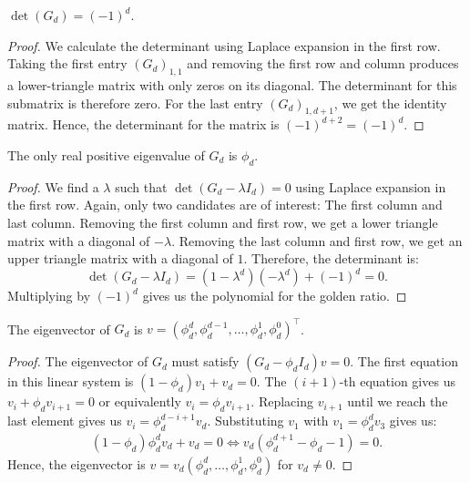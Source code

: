 \documentclass[english,version-2020-11]{uzl-thesis}
\begin{document}
\begin{lemma}
  $\det(G_d) = (-1)^d$.
\end{lemma}

\begin{proof}
  We calculate the determinant using Laplace expansion in the first row.
  Taking the first entry $(G_d)_{1,1}$ and removing the first row and column produces
  a lower-triangle matrix with only zeros on its diagonal.
  The determinant for this submatrix is therefore zero.
  For the last entry $(G_d)_{1,d+1}$, we get the identity matrix.
  Hence, the determinant for the matrix is $(-1)^{d+2} = (-1)^d$.
\end{proof}

\begin{lemma}
  The only real positive eigenvalue of $G_d$ is $\phi_d$.
\end{lemma}

\begin{proof}
  We find a $\lambda$ such that $\det(G_d - \lambda I_d) = 0$ using Laplace expansion in the first row.
  Again, only two candidates are of interest: The first column and last column.
  Removing the first column and first row, we get a lower triangle matrix with a diagonal of $-\lambda$.
  Removing the last column and first row, we get an upper triangle matrix with a diagonal of $1$.
  Therefore, the determinant is:
  \[
    \det(G_d - \lambda I_d) = (1 - \lambda^d) (-\lambda^d) + (-1)^d = 0.
  \]
  Multiplying by $(-1)^d$ gives us the polynomial for the golden ratio.
\end{proof}

\begin{lemma}
  The eigenvector of $G_d$ is $v = (\phi_d^d, \phi_d^{d-1}, \dots, \phi_d^1, \phi_d^0)^\top$.
\end{lemma}

\begin{proof}
  The eigenvector of $G_d$ must satisfy $(G_d - \phi_d I_d) v = 0$.
  The first equation in this linear system is $(1 - \phi_d) v_1 + v_d = 0$.
  The $(i+1)$-th equation gives us $v_i + \phi_d v_{i+1} = 0$ or equivalently $v_i = \phi_d v_{i+1}$.
  Replacing $v_{i+1}$ until we reach the last element gives us $v_i = \phi_d^{d - i + 1} v_d$.
  Substituting $v_1$ with $v_1 = \phi_d^d v_3$ gives us:
  \begin{align*}
    (1 - \phi_d) \phi_d^d v_d + v_d = 0 \iff v_d (\phi_d^{d+1} - \phi_d - 1) = 0.
  \end{align*}
  Hence, the eigenvector is $v = v_d (\phi_d^d, \dots, \phi_d^1, \phi_d^0)$ for $v_d \ne 0$.
\end{proof}
\end{document}
